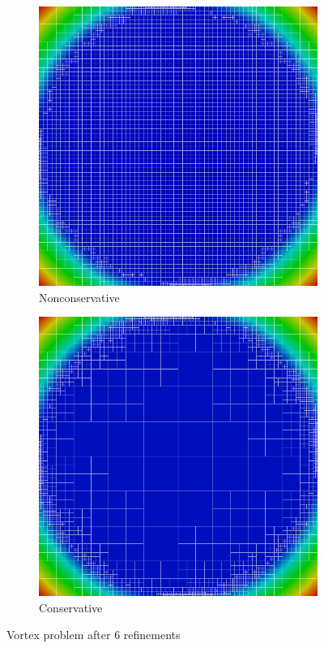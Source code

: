 \documentclass[Proposal.tex]{subfiles}
\begin{document}
\begin{figure}[p]
\centering
\begin{subfigure}[t]{0.45\textwidth}
\centering
\includegraphics[width=\textwidth]{figs/Vortex/modified6nc.png}
\caption{Nonconservative}
\label{fig:vortexModified6nc}
\end{subfigure}
\begin{subfigure}[t]{0.45\textwidth}
\centering
\includegraphics[width=\textwidth]{figs/Vortex/modified6c.png}
\caption{Conservative}
\label{fig:vortexModified6c}
\end{subfigure}
\caption{Vortex problem after 6 refinements}
\label{fig:vortex}
\end{figure}
\end{document}
